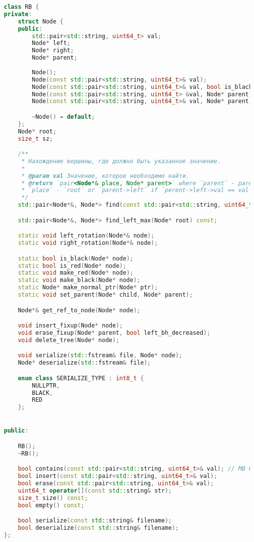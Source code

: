 \begin{lstlisting}[language=C++]
class RB {
private:
    struct Node {
    public:
        std::pair<std::string, uint64_t> val;
        Node* left;
        Node* right;
        Node* parent;
        
        Node();
        Node(const std::pair<std::string, uint64_t>& val);
        Node(const std::pair<std::string, uint64_t>& val, bool is_black);
        Node(const std::pair<std::string, uint64_t> &val, Node* parent);
        Node(const std::pair<std::string, uint64_t>& val, Node* parent, bool is_black);

        ~Node() = default;
    };
    Node* root;
    size_t sz;

    /**
     * Нахождение вершины, где должно быть указанное значение.
     *
     * @param val Значение, которое необходимо найти.
     * @return `pair<Node*& place, Node* parent>` where `parent` - parent for place where `val` must be,
     * `place` - `root` or `parent->left` if `perent->left->val == val` else `parent->right`
     */
    std::pair<Node*&, Node*> find(const std::pair<std::string, uint64_t>& val); // MB CONST

    std::pair<Node*&, Node*> find_left_max(Node* root) const;

    static void left_rotation(Node*& node);
    static void right_rotation(Node*& node);

    static bool is_black(Node* node);
    static bool is_red(Node* node);
    static void make_red(Node* node);
    static void make_black(Node* node);
    static Node* make_normal_ptr(Node* ptr);
    static void set_parent(Node* child, Node* parent);

    Node*& get_ref_to_node(Node* node);

    void insert_fixup(Node* node);
    void erase_fixup(Node* parent, bool left_bh_decreased);
    void delete_tree(Node* node);

    void serialize(std::fstream& file, Node* node);
    Node* deserialize(std::fstream& file);

    enum class SERIALIZE_TYPE : int8_t {
        NULLPTR,
        BLACK,
        RED
    };


public:

    RB();
    ~RB();

    bool contains(const std::pair<std::string, uint64_t>& val); // MB CONST
    bool insert(const std::pair<std::string, uint64_t>& val);
    bool erase(const std::pair<std::string, uint64_t>& val);
    uint64_t operator[](const std::string& str);
    size_t size() const;
    bool empty() const;

    bool serialize(const std::string& filename);
    bool deserialize(const std::string& filename);
};
\end{lstlisting}
\pagebreak

